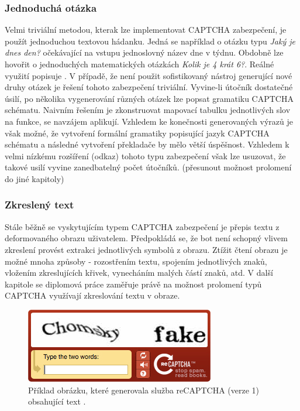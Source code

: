 \documentclass[
  field=ainfp,
  master=true,
  biblatex,
  sourcecodes=false,
  theorems=false,
  glossaries,
  index
]{kidiplom}
\begin{document}
\subsubsection*{Jednoduchá otázka}
Velmi triviální metodou, kterak lze implementovat CAPTCHA zabezpečení, je použít jednoduchou textovou hádanku. Jedná se například o otázku typu \textit{Jaký je dnes den?} očekávající na vstupu jednoslovný název dne v týdnu. Obdobně lze hovořit o jednoduchých matematických otázkách \textit{Kolik je 4 krát 6?}. Reálné využití popisuje \cite{web:textcaptcha}. V případě, že není použit sofistikovaný nástroj generující nové druhy otázek je řešení tohoto zabezpečení triviální. Vyvine-li útočník dostatečné úsilí, po několika vygenerování různých otázek lze popsat gramatiku CAPTCHA schématu. Naivním řešením je zkonstruovat mapovací tabulku jednotlivých slov na funkce, se navzájem aplikují. Vzhledem ke konečnosti generovaných výrazů je však možné, že vytvoření formální gramatiky popisující jazyk CAPTCHA schématu a následné vytvoření překladače by mělo větší úspěšnost. Vzhledem k velmi nízkému rozšíření (odkaz) tohoto typu zabezpečení však lze usuzovat, že takové usilí vyvine zanedbatelný počet útočníků. (přesunout možnost prolomení do jiné kapitoly)

\subsubsection*{Zkreslený text}
Stále běžně se vyskytujícím typem CAPTCHA zabezpečení je přepis textu z deformovaného obrazu uživatelem. Předpokládá se, že bot není schopný vlivem zkreslení provést extrakci jednotlivých symbolů z obrazu. Ztížit čtení obrazu je možné mnoha způsoby - rozostřením textu, spojením jednotlivých znaků, vložením zkreslujících křivek, vynecháním malých částí znaků, atd. V další kapitole se diplomová práce zaměřuje právě na možnost prolomení typů CAPTCHA využívají zkreslování textu v obraze.

\begin{figure}[H]
  \centering
  \includegraphics[scale=0.8]{images/text_image_captcha.jpg}
  \caption{Příklad obrázku, které generovala služba reCAPTCHA (verze 1) obsahující text .}
  \label{fig:captcha_text_image}
\end{figure}
\end{document}
